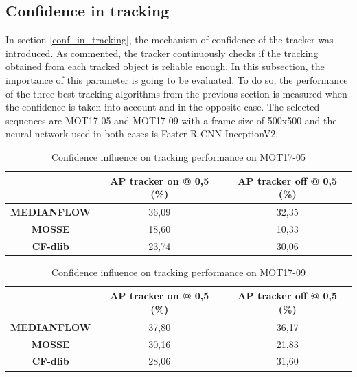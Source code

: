 \subsection{Confidence in tracking}
In section \ref{conf_in_tracking}, the mechanism of confidence of the tracker was introduced. As commented, the tracker continuously checks if the tracking obtained from each tracked object is reliable enough. In this subsection, the importance of this parameter is going to be evaluated. To do so, the performance of the three best tracking algorithms from the previous section is measured when the confidence is taken into account and in the opposite case. The selected sequences are MOT17-05 and MOT17-09 with a frame size of 500x500 and the neural network used in both cases is Faster R-CNN InceptionV2.\\
\begin{table}[H]
\scriptsize
\begin{center}
\begin{tabular}{|c|c|c|}
\hline
\textbf{}           & \textbf{AP tracker on @ 0,5 (\%)} & \textbf{AP tracker off @ 0,5 (\%)} \\ \hline
\textbf{MEDIANFLOW} & 36,09                             & 32,35                              \\ \hline
\textbf{MOSSE}      & 18,60                             & 10,33                              \\ \hline
\textbf{CF-dlib}    & 23,74                             & 30,06                              \\ \hline
\end{tabular}
\end{center}
\caption{Confidence influence on tracking performance on MOT17-05}
\label{tab:tracker_exp_4}
\end{table}
\begin{table}[H]
\scriptsize
\begin{center}
\begin{tabular}{|c|c|c|}
\hline
\textbf{}           & \textbf{AP tracker on @ 0,5 (\%)} & \textbf{AP tracker off @ 0,5 (\%)} \\ \hline
\textbf{MEDIANFLOW} & 37,80                             & 36,17                              \\ \hline
\textbf{MOSSE}      & 30,16                             & 21,83                              \\ \hline
\textbf{CF-dlib}    & 28,06                             & 31,60                              \\ \hline
\end{tabular}
\end{center}
\caption{Confidence influence on tracking performance on MOT17-09}
\label{tab:tracker_exp_5}
\end{table}
